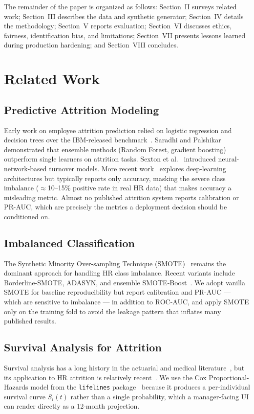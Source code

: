 \documentclass[conference]{IEEEtran}
\begin{document}
The remainder of the paper is organized as follows: Section~II
surveys related work; Section~III describes the data and synthetic
generator; Section~IV details the methodology; Section~V reports
evaluation; Section~VI discusses ethics, fairness, identification
bias, and limitations; Section~VII presents lessons learned during
production hardening; and Section~VIII concludes.

\section{Related Work}

\subsection{Predictive Attrition Modeling}
Early work on employee attrition prediction relied on logistic
regression and decision trees over the IBM-released
benchmark~\cite{ibm2017}. Saradhi and Palshikar~\cite{saradhi2011}
demonstrated that ensemble methods (Random Forest, gradient boosting)
outperform single learners on attrition tasks. Sexton et
al.~\cite{sexton2005} introduced neural-network-based turnover
models. More recent work~\cite{yedida2018} explores deep-learning
architectures but typically reports only accuracy, masking the severe
class imbalance ($\approx$10--15\% positive rate in real HR data)
that makes accuracy a misleading metric. Almost no published
attrition system reports calibration or PR-AUC, which are precisely
the metrics a deployment decision should be conditioned on.

\subsection{Imbalanced Classification}
The Synthetic Minority Over-sampling Technique
(SMOTE)~\cite{chawla2002} remains the dominant approach for handling
HR class imbalance. Recent variants include Borderline-SMOTE, ADASYN,
and ensemble SMOTE-Boost~\cite{chawla2003}. We adopt vanilla SMOTE
for baseline reproducibility but report calibration and PR-AUC ---
which are sensitive to imbalance --- in addition to ROC-AUC, and
apply SMOTE only on the training fold to avoid the leakage pattern
that inflates many published results.

\subsection{Survival Analysis for Attrition}
Survival analysis has a long history in the actuarial and medical
literature~\cite{cox1972, kalbfleisch2002}, but its application to
HR attrition is relatively recent~\cite{kuhn2018}. We use the Cox
Proportional-Hazards model from the \texttt{lifelines}
package~\cite{davidson2019} because it produces a per-individual
survival curve $S_i(t)$ rather than a single probability, which a
manager-facing UI can render directly as a 12-month projection.
\end{document}
